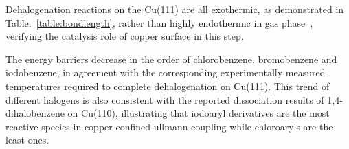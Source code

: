 \documentclass[%
 reprint,
 amsmath,amssymb,
 aps,
prb,
floatfix,
]{revtex4-2}
\newcommand{\lock}{\color{red}}
\newcommand{\zhzh}{\color{blue}}
\newcommand{\lock}{\color{black}}
\newcommand{\zhzh}{\color{black}}
\begin{document}
{\zhzh





Dehalogenation reactions on the Cu(111) are all exothermic, as demonstrated in Table.~\ref{table:bondlength}, rather than highly endothermic in gas phase~\cite{jacs2013}, verifying the catalysis role of copper surface in this step.


The energy barriers decrease in the order of chlorobenzene, bromobenzene and iodobenzene, in agreement with the corresponding experimentally measured temperatures required to complete dehalogenation on Cu(111). This trend of different halogens is also consistent with the reported dissociation results of 1,4-dihalobenzene on Cu(110)\cite{ullmann_52}, illustrating that iodoaryl derivatives are the most reactive species in copper-confined ullmann coupling while chloroaryls are the least ones. 


}
\end{document}
